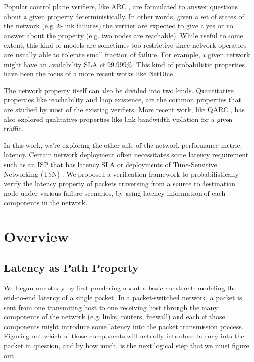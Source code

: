 \documentclass[10pt,sigconf,letterpaper,anonymous,nonacm]{acmart}
\begin{document}
Popular control plane verifiers, like ARC \cite{gember2016fast}, are formulated to answer 
questions about a given property deterministically. 
In other words, given a set of states of the network (e.g. $k$-link failures) the verifier are 
expected to give a yes or no answer about the property (e.g. two nodes are reachable).
While useful to some extent, this kind of models are sometimes too restrictive since network 
operators are usually able to tolerate small fraction of failure. 
For example, a given network might have an availability SLA of 99.999\%. 
This kind of probabilistic properties have been the focus of a more recent works like NetDice 
\cite{steffen2020probabilistic}.

The network property itself can also be divided into two kinds. 
Quantitative properties like reachability and loop existence, are the common properties that are 
studied by most of the existing verifiers. 
More recent work, like QARC \cite{subramanian2020detecting}, has also explored qualitative 
properties like link bandwidth violation for a given traffic.

In this work, we're exploring the other side of the network performance metric: latency. 
Certain network deployment often necessitates some latency requirement such as an ISP that has 
latency SLA \cite{Verizon} or deployments of Time-Sensitive Networking (TSN) \cite{TSN}.
We proposed a verification framework to probabilistically verify the latency property of packets 
traversing from a source to destination node under various failure scenarios, by using latency 
information of each components in the network.

\section{Overview}
\subsection{Latency as Path Property} 
We began our study by first pondering about a basic construct: modeling the end-to-end latency of 
a single packet.
In a packet-switched network, a packet is sent from one transmiting host to one receiving host 
through the many components of the network (e.g. links, routers, firewall) and each of those 
components might introduce some latency into the packet transmission process.
Figuring out which of those components will actually introduce latency into the packet in question, 
and by how much, is the next logical step that we must figure out.
\end{document}

